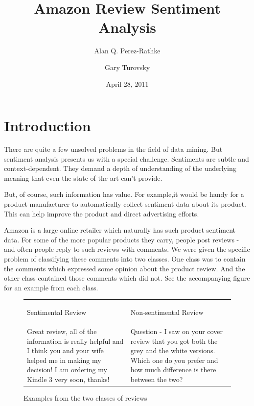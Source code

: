 \documentclass[]{report}
\begin{document}
\title{Amazon Review Sentiment Analysis} 
\author{Alan Q. Perez-Rathke \and Gary Turovsky}
\date{April 28, 2011}   
\maketitle


\section{Introduction} 
There are quite a few unsolved problems in the field of data mining.  But sentiment analysis presents us with a special challenge.  Sentiments are subtle and context-dependent.  They demand a depth of understanding of the underlying meaning that even the state-of-the-art can't provide.

But, of course, such information has value. For example,it would be handy for a product manufacturer to automatically collect sentiment data about its product.  This can help improve the product and direct advertising efforts.

Amazon is a large online retailer which naturally has such product sentiment data.  For some of the more popular products they carry, people post reviews - and often people reply to such reviews with comments.  We were given the specific problem of classifying these comments into two classes.  One class was to contain the comments which expressed some opinion about the product review.  And the other class contained those comments which did not.  See the accompanying figure for an example from each class.


\begin{figure}[h]
	\begin{center}
		\begin{tabular}{ p{5 cm}  p{5 cm} }
			\begin{center}Sentimental Review\end{center} & 
			\begin{center}Non-sentimental Review\end{center}\\
			Great review, all of the information is really helpful and I think you and your wife helped me in making my decision! I am ordering my Kindle 3 very soon, thanks!
			& 
			Question - I saw on your cover review that you got both the grey and the white versions. Which one do you prefer and how much difference is there between the two?  \\
		\end{tabular}
	\end{center}
	\caption{Examples from the two classes of reviews}
	\label{figExampleReviews}
\end{figure}
\end{document}
